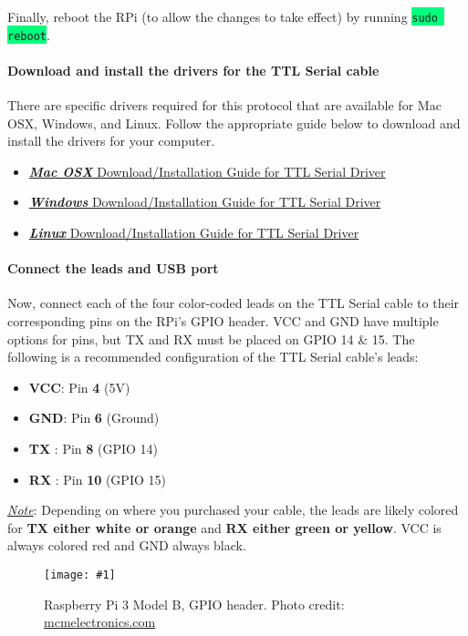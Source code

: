 \documentclass{article}
\newcommand{\codei}[1]{\colorbox{SpringGreen}{\texttt{#1}}} %
\newcommand{\imagefig}[2]{
    \begin{figure}[H]
        \centering
        \texttt{[image: \#1]}
        \caption{#2}
    \end{figure}
}
\begin{document}
    Finally, reboot the RPi (to allow the changes to take effect) by running \codei{sudo reboot}.

    \paragraph{Download and install the drivers for the TTL Serial cable}
    There are specific drivers required for this protocol that are available for Mac OSX, Windows, and Linux. Follow the appropriate guide below to download and install the drivers for your computer.
    \begin{itemize}
      \item \href{https://learn.adafruit.com/adafruits-raspberry-pi-lesson-5-using-a-console-cable/software-installation-mac}{\textit{\textbf{Mac OSX}} Download/Installation Guide for TTL Serial Driver}
      \item \href{https://learn.adafruit.com/adafruits-raspberry-pi-lesson-5-using-a-console-cable/software-installation-windows}{\textit{\textbf{Windows}} Download/Installation Guide for TTL Serial Driver}
      \item \href{https://learn.adafruit.com/adafruits-raspberry-pi-lesson-5-using-a-console-cable/software-installation-linux}{\textit{\textbf{Linux}} Download/Installation Guide for TTL Serial Driver}
    \end{itemize}

    \paragraph{Connect the leads and USB port}
    Now, connect each of the four color-coded leads on the TTL Serial cable to their corresponding pins on the RPi's GPIO header. VCC and GND have multiple options for pins, but TX and RX must be placed on GPIO 14 \& 15. The following is a recommended configuration of the TTL Serial cable's leads:
    \begin{itemize}
      \item \textbf{VCC}: Pin \textbf{4} (5V)
      \item \textbf{GND}: Pin \textbf{6} (Ground)
      \item \textbf{TX }: Pin \textbf{8} (GPIO 14)
      \item \textbf{RX }: Pin \textbf{10} (GPIO 15)
    \end{itemize}
    \underline{\textit{Note}}: Depending on where you purchased your cable, the leads are likely colored for \textbf{TX either white or orange} and \textbf{RX either green or yellow}. VCC is always colored red and GND always black.
    \imagefig{rpi3mb-gpio.png}{Raspberry Pi 3 Model B, GPIO header. Photo credit: \href{http://blog.mcmelectronics.com/post/Raspberry-Pi-3-GPIO-Pin-Layout}{mcmelectronics.com}}
\end{document}
